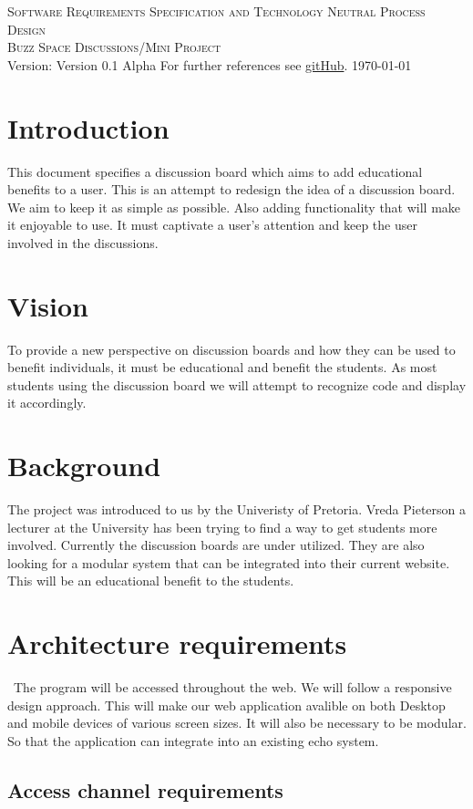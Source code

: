 \documentclass[a4paper,12pt]{report}
\begin{document}
\renewcommand{\thesection}{\arabic{section}}
\newpage
\begin{center}
\textsc{\LARGE Software Requirements Specification and Technology Neutral Process Design}\\[1.5cm]
\textsc{\Large Buzz Space Discussions/Mini Project}\\[0.5cm]
Version: Version 0.1 Alpha 
For further references see \href{http://www.sharelatex.com}{gitHub}.
\today
\end{center}
\tableofcontents{}
\section{Introduction}
This document specifies a discussion board which aims to add educational benefits to a user. This is an attempt to redesign the idea of a discussion board. We aim to keep it as simple as possible. Also adding functionality that will make it enjoyable to use. It must captivate a user's attention and keep the user involved in the discussions. 
\section{Vision}
To provide a new perspective on discussion boards and how they can be used to benefit individuals, it must be educational and benefit the students. As most students using the discussion board we will attempt to recognize code and display it accordingly.
\section{Background}
The project was introduced to us by the Univeristy of Pretoria. Vreda Pieterson a lecturer at the University has been trying to find a way to get students more involved. Currently the discussion boards are under utilized. They are also looking for a modular system that can be integrated into their current website. This will be an educational benefit to the students.
\section{Architecture requirements}\
The program will be accessed throughout the web. We will follow a responsive design approach. This will make our web application avalible on both Desktop and mobile devices of various screen sizes. It will also be necessary to be modular. So that the application can integrate into an existing echo system.
\subsection{Access channel requirements}
\end{document}
